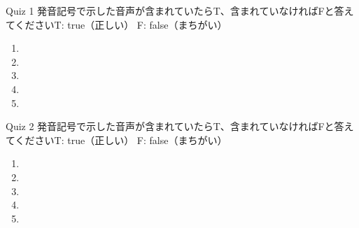 \documentclass[aspectratio=169,xcolor={dvipsnames,table}]{beamer}
\begin{document}
\begin{frame}[plain]{Quiz 1 }
\large
発音記号で示した音声が含まれていたらT、含まれていなければFと答えてください\hfill{}{\scriptsize T: true（正しい）\hspace{5pt} F: false（まちがい）}
 \begin{enumerate}
  \item \mbox{}\hspace{1\zw}
  \item \mbox{}\visible<3->{T}\hspace{1\zw}
  \item \mbox{}\hspace{1\zw}
  \item \mbox{}\hspace{1\zw}
  \item \mbox{}\hspace{1\zw}
 \end{enumerate}

\hfill{}
\end{frame}
\begin{frame}[plain]{Quiz 2 }
\large
発音記号で示した音声が含まれていたらT、含まれていなければFと答えてください\hfill{}{\scriptsize T: true（正しい）\hspace{5pt} F: false（まちがい）}
 \begin{enumerate}
  \item \mbox{}\visible<2->{F}\hspace{1\zw}
  \item \mbox{}\hspace{1\zw}
  \item \mbox{}\visible<4->{T}\hspace{1\zw}
  \item \mbox{}\hspace{1\zw}
  \item \mbox{}\hspace{1\zw}
 \end{enumerate}

\hfill{}
\end{frame}
\end{document}
